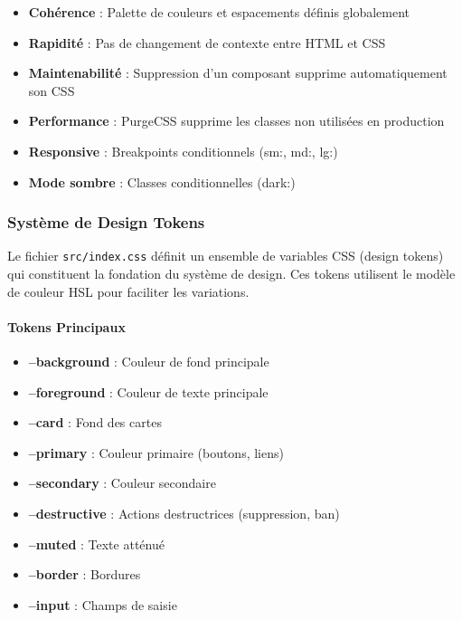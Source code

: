 \begin{itemize}
    \item \textbf{Cohérence} : Palette de couleurs et espacements définis globalement
    \item \textbf{Rapidité} : Pas de changement de contexte entre HTML et CSS
    \item \textbf{Maintenabilité} : Suppression d'un composant supprime automatiquement son CSS
    \item \textbf{Performance} : PurgeCSS supprime les classes non utilisées en production
    \item \textbf{Responsive} : Breakpoints conditionnels (sm:, md:, lg:)
    \item \textbf{Mode sombre} : Classes conditionnelles (dark:)
\end{itemize}

\subsubsection{Système de Design Tokens}

Le fichier \texttt{src/index.css} définit un ensemble de variables CSS (design tokens) qui constituent la fondation du système de design. Ces tokens utilisent le modèle de couleur HSL pour faciliter les variations.

\paragraph{Tokens Principaux}

\begin{itemize}
    \item \textbf{--background} : Couleur de fond principale
    \item \textbf{--foreground} : Couleur de texte principale
    \item \textbf{--card} : Fond des cartes
    \item \textbf{--primary} : Couleur primaire (boutons, liens)
    \item \textbf{--secondary} : Couleur secondaire
    \item \textbf{--destructive} : Actions destructrices (suppression, ban)
    \item \textbf{--muted} : Texte atténué
    \item \textbf{--border} : Bordures
    \item \textbf{--input} : Champs de saisie
\end{itemize}

